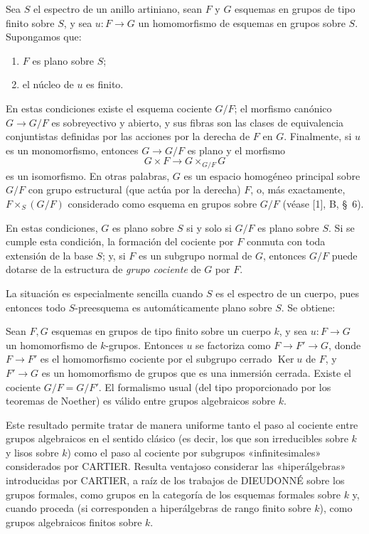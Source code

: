  Sea $S$ el espectro de un anillo artiniano, sean $F$ y
$G$ esquemas en grupos de tipo finito sobre $S$, y sea $u:F\to G$ un
homomorfismo de esquemas en grupos sobre $S$. Supongamos que:
\begin{enumerate}
\item[(i)] $F$ es plano sobre $S$;
\item[(ii)] el núcleo de $u$ es finito.
\end{enumerate}
En estas condiciones existe el esquema cociente $G/F$; el morfismo canónico
$G\to G/F$ es sobreyectivo y abierto, y sus fibras son las clases de
equivalencia conjuntistas definidas por las acciones por la derecha de $F$ en
$G$. Finalmente, si $u$ es un monomorfismo, entonces $G\to G/F$ es plano y
el morfismo
\[
  G\times F\longrightarrow G\times_{G/F}G
\]
es un isomorfismo. En otras palabras, $G$ es un espacio homogéneo principal
sobre $G/F$ con grupo estructural (que actúa por la derecha) $F$, o, más
exactamente, $F\times_S(G/F)$ considerado como esquema en grupos sobre $G/F$
(véase [1], B, \S~6).

 En estas condiciones, $G$ es plano sobre $S$ si y
solo si $G/F$ es plano sobre $S$. Si se cumple esta condición, la formación
del cociente por $F$ conmuta con toda extensión de la base $S$; y, si $F$ es
un subgrupo normal de $G$, entonces $G/F$ puede dotarse de la estructura de
\emph{grupo cociente} de $G$ por $F$.

La situación es especialmente sencilla cuando $S$ es el espectro de un
cuerpo, pues entonces todo $S$-preesquema es automáticamente plano sobre $S$.
Se obtiene:

 Sean $F,G$ esquemas en grupos de tipo finito sobre un
cuerpo $k$, y sea $u:F\to G$ un homomorfismo de $k$-grupos. Entonces $u$ se
factoriza como $F\to F'\to G$, donde $F\to F'$ es el homomorfismo cociente
por el subgrupo cerrado $\operatorname{Ker}u$ de $F$, y $F'\to G$ es un
homomorfismo de grupos que es una inmersión cerrada. Existe el cociente
$G/F=G/F'$. El formalismo usual (del tipo proporcionado por los teoremas de
Noether) es válido entre grupos algebraicos sobre $k$.

Este resultado permite tratar de manera uniforme tanto el paso al cociente
entre grupos algebraicos en el sentido clásico (es decir, los que son
irreducibles sobre $k$ y lisos sobre $k$) como el paso al cociente por
subgrupos «infinitesimales»
considerados por CARTIER. Resulta ventajoso considerar las «hiperálgebras»
introducidas por CARTIER, a raíz de los trabajos de DIEUDONNÉ sobre los grupos
formales, como grupos en la categoría de los esquemas formales sobre $k$ y,
cuando proceda (si corresponden a hiperálgebras de rango finito sobre $k$),
como grupos algebraicos finitos sobre $k$.

